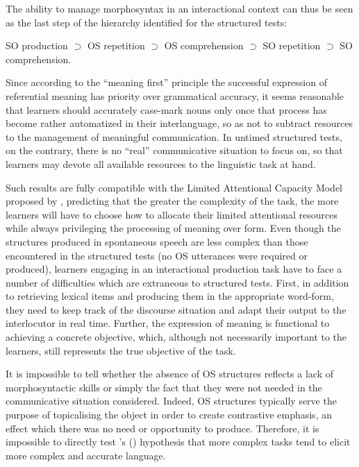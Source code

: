 \-The ability to manage morphosyntax in an interactional context can thus be seen as the last step of the hierarchy identified for the structured tests: 

SO production ${\supset}$ OS repetition ${\supset}$ OS comprehension ${\supset}$ SO repetition ${\supset}$ SO comprehension.

Since according to the “meaning first” principle the successful expression of referential meaning has priority over grammatical accuracy, it seems reasonable that learners should accurately case-mark nouns only once that process has become rather automatized in their interlanguage, so as not to subtract resources to the management of meaningful communication. In untimed structured tests, on the contrary, there is no “real” communicative situation to focus on, so that learners may devote all available resources to the linguistic task at hand. 

Such results are fully compatible with the Limited Attentional Capacity Model proposed by \citet{SkehanFoster2001}, predicting that the greater the complexity of the task, the more learners will have to choose how to allocate their limited attentional resources while always privileging the processing of meaning over form. Even though the structures produced in spontaneous speech are less complex than those encountered in the structured tests (no OS utterances were required or produced), learners engaging in an interactional production task have to face a number of difficulties which are extraneous to structured tests. First, in addition to retrieving lexical items and producing them in the appropriate word-form, they need to keep track of the discourse situation and adapt their output to the interlocutor in real time. Further, the expression of meaning is functional to achieving a concrete objective, which, although not necessarily important to the learners, still represents the true objective of the task. 

It is impossible to tell whether the absence of OS structures reflects a lack of morphosyntactic skills or simply the fact that they were not needed in the communicative situation considered. Indeed, OS structures typically serve the purpose of topicalising the object in order to create contrastive emphasis, an effect which there was no need or opportunity to produce. Therefore, it is impossible to directly test \citeauthor{Robinson2001}'s (\citeyear{Robinson2001, Robinson2005}) hypothesis that more complex tasks tend to elicit more complex and accurate language.

